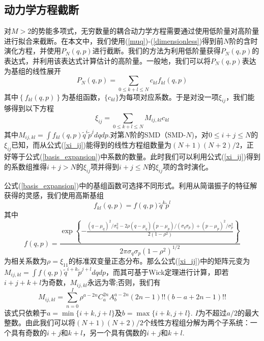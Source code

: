 \subsection{动力学方程截断}
对$M>2$的势能多项式，无穷数量的耦合动力学方程需要通过使用低阶量对高阶量进行拟合来截断。在本文中，我们使用(\ref{muq})-(\ref{dimensionless})得到前$N$阶的含时演化方程，并使用$P_N(q,p)$进行截断。我们的方法为利用低阶量获得$P_N(q,p)$的表达式，并利用该表达式计算估计的高阶量。一般地，我们可以将$P_N(q,p)$表达为基组的线性展开
\begin{equation}
	P_{N}(q, p)=\sum_{0 \leq k+l \leq N} c_{k l} f_{k l}(q, p)
	\label{basis_expansion}
\end{equation}
其中$\left\{f_{k l}(q, p)\right\}$为基组函数，$\{c_{kl}\}$为每项对应系数。于是对没一项$\xi_{ij}$，我们能够得到以下方程
\begin{equation}
	\xi_{i j}=\sum_{0 \leq k+l \leq N} M_{i j, k l} c_{k l}
	\label{xi_ij}
\end{equation}
其中$M_{i j, k l}=\int f_{k l}(q, p) \tilde{q}^{i} \tilde{p}^{j} d q d p$.对第$N$阶的SMD（SMD-$N$)，对$0 \leq i+j \leq N$的$\xi_{ij}$已知，而从公式(\ref{xi_ij})能得到的线性方程组数量为$(N+1)(N+2)/2$，正好等于公式(\ref{basis_expansion})中系数的数量。此时我们可以利用公式(\ref{xi_ij})得到的系数组推得$i+j>N$的$\xi_{ij}$项并得到$i+j\leq N$的$\xi_{ij}$项的含时演化。

公式(\ref{basis_expansion})中的基组函数可选择不同形式。利用从简谐振子的特征解获得的灵感，我们使用高斯基组
\begin{equation}
	f_{k l}(q, p)=f(q, p) \tilde{q}^{k} \tilde{p}^{l}
	\label{dimenstionless_phasespace}
\end{equation}
其中
\begin{equation*}
f(q, p)=\frac{\exp \left\{-\frac{\left(q-\mu_{q}\right)^{2} / \sigma_{q}^{2}-2 \rho\left(q-\mu_{q}\right)\left(p-\mu_{p}\right)/\left.\left.\left(\sigma_{q} \sigma_{p}\right)+\left(p-\mu_{p}\right)^{2} / \sigma_{p}^{2}}{2\left(1-\rho^{2}\right)}\right\}}{2 \pi \sigma_{q} \sigma_{p}\left(1-\rho^{2}\right)^{1 / 2}}
\end{equation*}
为相关系数为$\rho = \xi_{11}$的标准双变量正态分布。那么公式(\ref{xi_ij})中的矩阵元变为$M_{i j, k l}=\int f(q, p) \tilde{q}^{i+k} \tilde{p}^{j+l} d q d p$，而其可基于Wick定理进行计算，即若$i+j+k+l$为奇数，$M_{ij,kl}$永远为零;否则，我们有
\begin{equation}
	M_{i j, k l}=\sum_{n=0}^{I} \rho^{a-2 n} C_{a}^{2 n} A_{b}^{a-2 n}(2 n-1) ! !(b-a+2 n-1) ! !
	\label{matrixelement}
\end{equation}
该式只依赖于$a = \min \{i + k, j + l\}$及$b = \max \{i+k, j+l\}$. $I$为不超过$a/2$的最大整数。由此我们可以将$(N+1)(N+2)/2$个线性方程组分解为两个子系统：一个具有奇数的$i+j$和$k+l$，另一个具有偶数的$i+j$和$k+l$.

